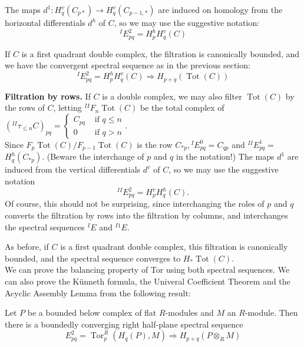 The maps $d^1: H_q^v\left(C_{p *}\right) \rightarrow H_q^v\left(C_{p-1, *}\right)$ are induced on homology from the horizontal differentials $d^h$ of $C$, so we may use the suggestive notation:
$$
{}^I E_{p q}^2=H_p^h H_q^v(C)
$$

If $C$ is a first quadrant double complex, the filtration is canonically bounded, and we have the convergent spectral sequence as in the previous section:
$$
{ }^I E_{p q}^2=H_p^h H_q^v(C) \Rightarrow H_{p+q}(\operatorname{Tot}(C))
$$

\textbf{Filtration by rows.} If $C$ is a double complex, we may also filter $\operatorname{Tot}(C)$ by the rows of $C$, letting ${ }^{I I} F_n \operatorname{Tot}(C)$ be the total complex of $\left({ }^{I I} \tau_{\leq n} C\right)_{p q}= \begin{cases}C_{p q} & \text { if } q \leq n \\ 0 & \text { if } q>n\end{cases}$. \\
Since $F_p \operatorname{Tot}(C) / F_{p-1} \operatorname{Tot}(C)$ is the row $C_{* p},{ }^I E_{p q}^0=C_{q p}$ and ${ }^{I I} E_{p q}^1=$ $H_q^h\left(C_{* p}\right)$. (Beware the interchange of $p$ and $q$ in the notation!) The maps $d^1$ are induced from the vertical differentials $d^v$ of $C$, so we may use the suggestive notation $$ {}^{II} E^2_{pq} = H^v _p H^h _q (C) .$$
Of course, this should not be surprising, since interchanging the roles of $p$ and $q$ converts the filtration by rows into the filtration by columns, and interchanges the spectral sequences ${ }^I E$ and ${ }^{I 1} E$.

As before, if $C$ is a first quadrant double complex, this filtration is canonically bounded, and the spectral sequence converges to $H_* \operatorname{Tot}(C)$.\\

We can prove the balancing property of Tor using both spectral sequences. We can also prove the Künneth formula, the Univeral Coefficient Theorem and the Acyclic Assembly Lemma from the following result:

\begin{theo}
Let $P$ be a bounded below complex of flat $R$-modules and $M$ an $R$-module. Then there is a boundedly converging right half-plane spectral sequence
    $$
    E_{p q}^2=\operatorname{Tor}_p^R\left(H_q(P), M\right) \Rightarrow H_{p+q}\left(P \otimes_R M\right)
    $$    
\end{theo}

